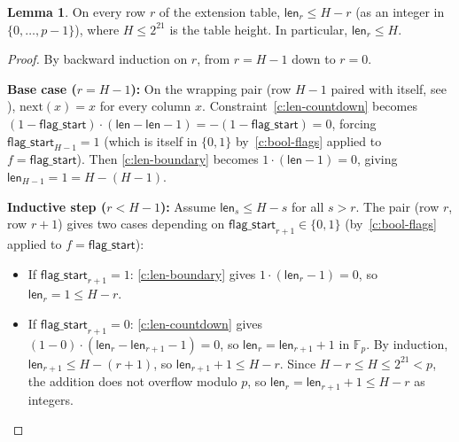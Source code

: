 \documentclass{article}
\theoremstyle{definition}
\newcommand{\Fp}{\mathbb F_p}
\newtheorem{lemma}{Lemma}
\begin{document}
\vspace{5mm}

\begin{lemma}\label{lem:len-bound}
On every row $r$ of the extension table, $\textsf{len}_r \leq H - r$ (as an integer in $\{0, \dots, p-1\}$), where $H \leq 2^{21}$ is the table height. In particular, $\textsf{len}_r \leq H$.
\end{lemma}

\begin{proof}
By backward induction on $r$, from $r = H - 1$ down to $r = 0$.

\vspace{2mm}

\textbf{Base case ($r = H - 1$):} On the wrapping pair (row $H\!-\!1$ paired with itself, see ), $\text{next}(x) = x$ for every column $x$. Constraint~\eqref{c:len-countdown} becomes $(1 - \textsf{flag\_start}) \cdot (\textsf{len} - \textsf{len} - 1) = -(1 - \textsf{flag\_start}) = 0$, forcing $\textsf{flag\_start}_{H-1} = 1$ (which is itself in $\{0, 1\}$ by~\eqref{c:bool-flags} applied to $f = \textsf{flag\_start}$). Then \eqref{c:len-boundary} becomes $1 \cdot (\textsf{len} - 1) = 0$, giving $\textsf{len}_{H-1} = 1 = H - (H-1)$.

\vspace{2mm}

\textbf{Inductive step ($r < H - 1$):} Assume $\textsf{len}_s \leq H - s$ for all $s > r$. The pair (row $r$, row $r\!+\!1$) gives two cases depending on $\textsf{flag\_start}_{r+1} \in \{0,1\}$ (by~\eqref{c:bool-flags} applied to $f = \textsf{flag\_start}$):

\begin{itemize}
    \item If $\textsf{flag\_start}_{r+1} = 1$: \eqref{c:len-boundary} gives $1 \cdot (\textsf{len}_r - 1) = 0$, so $\textsf{len}_r = 1 \leq H - r$.
    \item If $\textsf{flag\_start}_{r+1} = 0$: \eqref{c:len-countdown} gives $(1 - 0) \cdot (\textsf{len}_r - \textsf{len}_{r+1} - 1) = 0$, so $\textsf{len}_r = \textsf{len}_{r+1} + 1$ in $\Fp$. By induction, $\textsf{len}_{r+1} \leq H - (r+1)$, so $\textsf{len}_{r+1} + 1 \leq H - r$. Since $H - r \leq H \leq 2^{21} < p$, the addition does not overflow modulo $p$, so $\textsf{len}_r = \textsf{len}_{r+1} + 1 \leq H - r$ as integers.
\end{itemize}
\end{proof}

\vspace{3mm}
\end{document}
